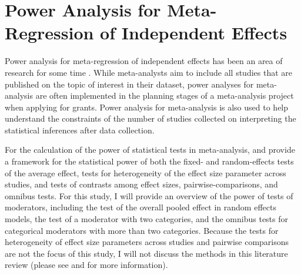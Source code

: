 






\section{Power Analysis for Meta-Regression of Independent Effects}

Power analysis for meta-regression of independent effects has been an area of research for some time \autocite{hedges2001, hedges2004, valentine2010, jackson2017}. While meta-analysts aim to include all studies that are published on the topic of interest in their dataset, power analyses for meta-analysis are often implemented in the planning stages of a meta-analysis project when applying for grants. Power analysis for meta-analysis is also used to help understand the constraints of the number of studies collected on interpreting the statistical inferences after data collection. 

For the calculation of the power of statistical tests in meta-analysis, \textcite{hedges2001} and \textcite{hedges2004} provide a framework for the statistical power of both the fixed- and random-effects tests of the average effect, tests for heterogeneity of the effect size parameter across studies, and tests of contrasts among effect sizes, pairwise-comparisons, and omnibus tests. For this study, I will provide an overview of the power of tests of moderators, including the test of the overall pooled effect in random effects models, the test of a moderator with two categories, and the omnibus tests for categorical moderators with more than two categories. Because the tests for heterogeneity of effect size parameters across studies and pairwise comparisons are not the focus of this study, I will not discuss the methods in this literature review (please see \textcite{hedges2001} and \textcite{hedges2004} for more information). 
     
